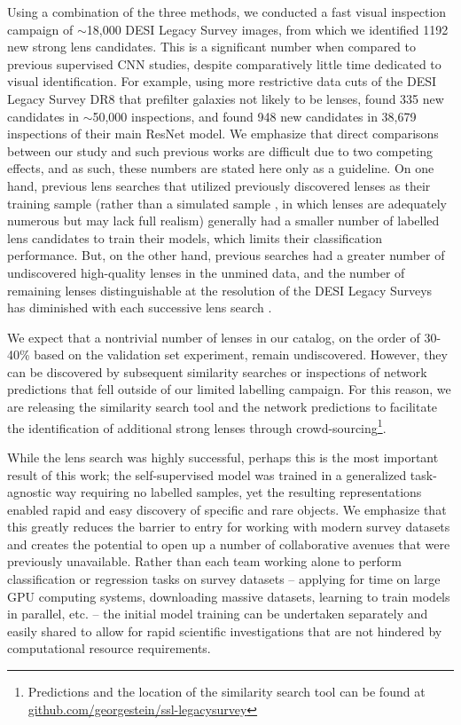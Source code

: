 \documentclass{aastex631}
\begin{document}
Using a combination of the three methods, we conducted a fast visual inspection campaign of $\sim$18,000 DESI Legacy Survey images, from which we identified 1192 new strong lens candidates. This is a significant number when compared to previous supervised CNN studies, despite comparatively little time dedicated to visual identification. For example, using more restrictive data cuts of the DESI Legacy Survey DR8 that prefilter galaxies not likely to be lenses, \citealt{HuangI} found 335 new candidates in $\sim$50,000 inspections, and \citealt{HuangII} found 948 new candidates in 38,679 inspections of their main ResNet model. We emphasize that direct comparisons between our study and such previous works are difficult due to two competing effects, and as such, these numbers are stated here only as a guideline. On one hand, previous lens searches that utilized previously discovered lenses as their training sample (rather than a simulated sample \citep[e.g.]{JacobsI}, in which lenses are adequately numerous but may lack full realism) generally had a smaller number of labelled lens candidates to train their models, which limits their classification performance. But, on the other hand, previous searches had a greater number of undiscovered high-quality lenses in the unmined data, and the number of remaining lenses distinguishable at the resolution of the DESI Legacy Surveys has diminished with each successive lens search \cite{HuangI, HuangII}.

We expect that a nontrivial number of lenses in our catalog, on the order of 30-40\% based on the validation set experiment, remain undiscovered.  However, they can be discovered by subsequent similarity searches or inspections of network predictions that fell outside of our limited labelling campaign. For this reason, we are releasing the similarity search tool and the network predictions to facilitate the identification of additional strong lenses through crowd-sourcing\footnote{Predictions and the location of the similarity search tool can be found at \href{https://github.com/georgestein/ssl-legacysurvey}{github.com/georgestein/ssl-legacysurvey}}.


While the lens search was highly successful, perhaps this is the most important result of this work; the self-supervised model was trained in a generalized task-agnostic way requiring no labelled samples, yet the resulting representations enabled rapid and easy discovery of specific and rare objects. We emphasize that this greatly reduces the barrier to entry for working with modern survey datasets and creates the potential to open up a number of collaborative avenues that were previously unavailable. Rather than each team working alone to perform classification or regression tasks on survey datasets -- applying for time on large GPU computing systems, downloading massive datasets, learning to train models in parallel, etc. -- the initial model training can be undertaken separately and easily shared to allow for rapid scientific investigations that are not hindered by computational resource requirements.
 
\end{document}
